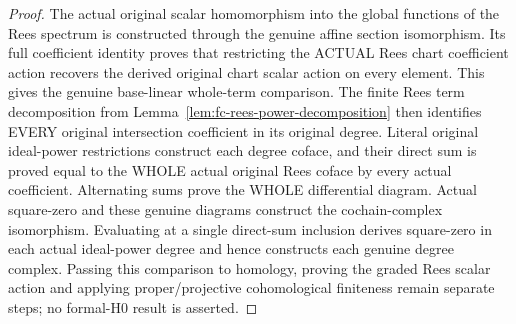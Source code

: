 \begin{proof}
The actual original scalar homomorphism into the global functions of the Rees
spectrum is constructed through the genuine affine section isomorphism. Its full
coefficient identity proves that restricting the ACTUAL Rees chart coefficient
action recovers the derived original chart scalar action on every element.
This gives the genuine base-linear whole-term comparison. The finite Rees term
decomposition from Lemma~\ref{lem:fc-rees-power-decomposition} then identifies
EVERY original intersection coefficient in its original degree. Literal original
ideal-power restrictions construct each degree coface, and their direct sum is
proved equal to the WHOLE actual original Rees coface by every actual coefficient.
Alternating sums prove the WHOLE differential diagram. Actual square-zero and
these genuine diagrams construct the cochain-complex isomorphism. Evaluating
at a single direct-sum inclusion derives square-zero in each actual ideal-power
degree and hence constructs each genuine degree complex. Passing this comparison
to homology, proving the graded Rees scalar action and applying proper/projective
cohomological finiteness remain separate steps; no formal-H0 result is asserted.
\end{proof}
